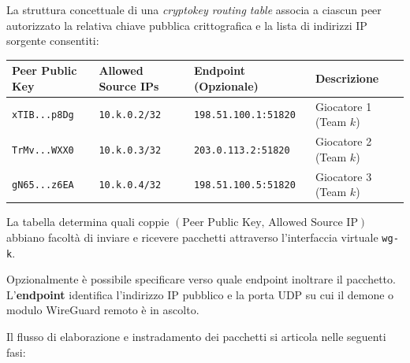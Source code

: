 \pagebreak

La struttura concettuale di una \emph{cryptokey routing table} associa a
ciascun peer autorizzato la relativa chiave pubblica crittografica e la
lista di indirizzi IP sorgente consentiti:

\begin{longtable}[]{@{}
  >{\raggedright\arraybackslash}p{}
  >{\raggedright\arraybackslash}p{}
  >{\raggedright\arraybackslash}p{}
  >{\raggedright\arraybackslash}p{}@{}}
\toprule\noalign{}
\begin{minipage}[b]{\linewidth}\raggedright
Peer Public Key
\end{minipage} & \begin{minipage}[b]{\linewidth}\raggedright
Allowed Source IPs
\end{minipage} & \begin{minipage}[b]{\linewidth}\raggedright
Endpoint (Opzionale)
\end{minipage} & \begin{minipage}[b]{\linewidth}\raggedright
Descrizione
\end{minipage} \\
\midrule\noalign{}
\endhead
\bottomrule\noalign{}
\endlastfoot
\passthrough{\lstinline!xTIB...p8Dg!} &
\passthrough{\lstinline!10.k.0.2/32!} &
\passthrough{\lstinline!198.51.100.1:51820!} & Giocatore 1 (Team
\(k\)) \\
\passthrough{\lstinline!TrMv...WXX0!} &
\passthrough{\lstinline!10.k.0.3/32!} &
\passthrough{\lstinline!203.0.113.2:51820!} & Giocatore 2 (Team
\(k\)) \\
\passthrough{\lstinline!gN65...z6EA!} &
\passthrough{\lstinline!10.k.0.4/32!} &
\passthrough{\lstinline!198.51.100.5:51820!} & Giocatore 3 (Team
\(k\)) \\
\end{longtable}

La tabella determina quali coppie
\((\text{Peer Public Key, Allowed Source IP})\) abbiano facoltà di
inviare e ricevere pacchetti attraverso l'interfaccia virtuale
\passthrough{\lstinline!wg-k!}.

Opzionalmente è possibile specificare verso quale endpoint inoltrare il
pacchetto. L'\textbf{endpoint} identifica l'indirizzo IP pubblico e la
porta UDP su cui il demone o modulo WireGuard remoto è in ascolto.

Il flusso di elaborazione e instradamento dei pacchetti si articola
nelle seguenti fasi:

